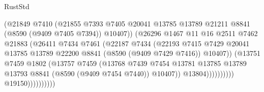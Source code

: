 \begin{lexlean}{RustStd}
\begin{coremodule}
                                      (@21849
                                        @7410
                                        (@21855
                                          @7393
                                          @7405
                                          @20041
                                          @13785
                                          @13789
                                          @21211
                                          @8841
                                          (@8590 (@9409 @7405 @7394))
                                          @10407))
                                      (@26296
                                        @1467
                                        @11
                                        @16
                                        @2511
                                        @7462
                                        @21883
                                        (@26411
                                          @7434
                                          @7461
                                          (@22187
                                            @7434
                                            (@22193
                                              @7415
                                              @7429
                                              @20041
                                              @13785
                                              @13789
                                              @22200
                                              @8841
                                              (@8590 (@9409 @7429 @7416))
                                              @10407))
                                          (@13751
                                            @7459
                                            @1802
                                            (@13757
                                              @7459
                                              (@13768
                                                @7439
                                                @7454
                                                @13781
                                                @13785
                                                @13789
                                                @13793
                                                @8841
                                                (@8590 (@9409 @7454 @7440))
                                                @10407))
                                            @13804))))))))))
                        @19150))))))))))

\end{coremodule}
\end{lexlean}
